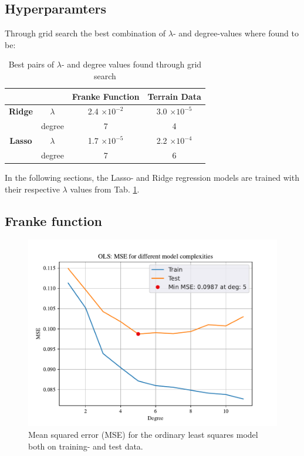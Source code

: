 \subsection{Hyperparamters}

Through grid search the best combination of $\lambda$- and degree-values where found to be: 

\begin{table}[h!]
    \centering
    \begin{tabular}{|c|c|c|c|}
        \hline
        & & \textbf{Franke Function} & \textbf{Terrain Data} \\ \hline
        \textbf{Ridge} & $\lambda$ & 2.4 $\times 10^{-2}$ & 3.0 $\times 10^{-5}$ \\ 
         & degree & 7 & 4 \\ \hline
        \textbf{Lasso} & $\lambda$ & 1.7 $\times 10^{-5}$ & 2.2 $\times 10^{-4}$ \\ 
         & degree & 7 & 6 \\ \hline
    \end{tabular}
    \caption{Best pairs of $\lambda$- and degree values found through grid search}
    \label{tab:grid}
\end{table}

In the following sections, the Lasso- and Ridge regression models are trained with their respective $\lambda$ values from Tab. \ref{tab:grid}. 

\subsection{Franke function}

\begin{figure}[h!]
    \centering
    \includegraphics[width=1\linewidth]{project_1/figures/figures_in_report/OLS_MSE_Franke_Noise.pdf}
    \caption{Mean squared error (MSE) for the ordinary least squares model both on training- and test data.}
    \label{fig:mseols}
\end{figure}

